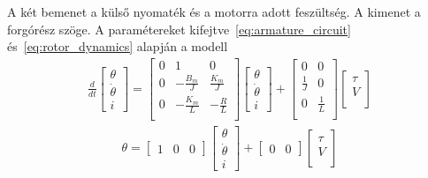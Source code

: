 A két bemenet a külső nyomaték és a motorra adott feszültség. A kimenet a forgórész szöge.
A paramétereket kifejtve~\eqref{eq:armature_circuit} és~\eqref{eq:rotor_dynamics} alapján a modell
\begin{align}\label{eq:state_space}
    \frac{d}{dt}
    \begin{bmatrix}
        \theta \\
        \dot\theta \\
        i
    \end{bmatrix}
    =
    \begin{bmatrix}
        0 & 1 & 0 \\
        0 & -\frac{B_m}{J} & \frac{K_m}{J} \\
        0 & -\frac{K_m}{L} & -\frac{R}{L} \\
    \end{bmatrix}
    \begin{bmatrix}
        \theta \\
        \dot\theta \\
        i
    \end{bmatrix}
    +
    \begin{bmatrix}
        0 & 0 \\
        \frac{1}{J} & 0 \\
        0 & \frac{1}{L} \\
    \end{bmatrix}
    \begin{bmatrix}
        \tau \\
        V \\
    \end{bmatrix}
\end{align}
\begin{align}\label{eq:state_space_out}
    \theta = 
    \begin{bmatrix}
        1 & 0 & 0
    \end{bmatrix}
    \begin{bmatrix}
        \theta \\
        \dot\theta \\
        i
    \end{bmatrix}
    +
    \begin{bmatrix}
        0 & 0
    \end{bmatrix}
    \begin{bmatrix}
        \tau \\
        V \\
    \end{bmatrix}
\end{align}
